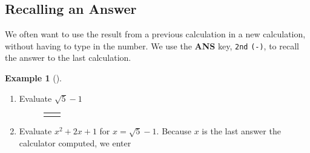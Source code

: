 \documentclass[10pt,]{book}
\newcommand{\terminology}[1]{\textbf{#1}}
\theoremstyle{plain}
\theoremstyle{definition}
\theoremstyle{definition}
\newtheorem{example}[theorem]{Example}
\theoremstyle{definition}
\numberwithin{equation}{part}
\newlength{\panelmax}
\begin{document}
\subsection[{Recalling an Answer}]{Recalling an Answer}\label{subsection-75}
We often want to use the result from a previous calculation in a new calculation, without having to type in the number. We use the \terminology{ANS} key, \lstinline?2nd? \lstinline?(-)?, to recall the answer to the last calculation.%
\begin{example}[]\label{example-114}
\leavevmode%
\begin{enumerate}[label=*\alph**]
\item\hypertarget{li-409}{}Evaluate \(\sqrt{5}-1 \) %
{%
\setlength{\panelmax}{0pt}
\newsavebox{\panelboxAKQp}
\newlength{\phAKQp}\setlength{\phAKQp}{\ht\panelboxAKQp+\dp\panelboxAKQp}
\settototalheight{\phAKQp}{\usebox{\panelboxAKQp}}
\setlength{\panelmax}{\maxof{\panelmax}{\phAKQp}}
\newsavebox{\panelboxAKRp}
\newlength{\phAKRp}\setlength{\phAKRp}{\ht\panelboxAKRp+\dp\panelboxAKRp}
\settototalheight{\phAKRp}{\usebox{\panelboxAKRp}}
\setlength{\panelmax}{\maxof{\panelmax}{\phAKRp}}
\leavevmode%
\setlength{\tabcolsep}{0.025\textwidth}
\begin{figure}
\begin{tabular}{@{}*{2}{c}@{}}
\begin{minipage}[c][\panelmax][t]{0.65\textwidth}\usebox{\panelboxAKQp}\end{minipage}&
\begin{minipage}[c][\panelmax][t]{0.3\textwidth}\usebox{\panelboxAKRp}\end{minipage}\end{tabular}
\end{figure}
}%
%
\item\hypertarget{li-410}{}Evaluate \(x^2 + 2x + 1\) for \(x = \sqrt{5}-1 \). Because \(x\) is the last answer the calculator computed, we enter %

\end{enumerate}
\end{example}
\end{document}
